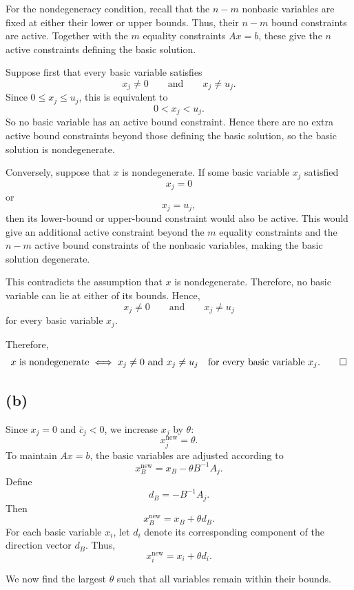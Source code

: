\documentclass{article}
\begin{document}
\vspace{5mm}


For the nondegeneracy condition, recall that the $n-m$ nonbasic
variables are fixed at either their lower or upper bounds. Thus, their
$n-m$ bound constraints are active. Together with the $m$ equality
constraints $Ax=b$, these give the $n$ active constraints defining the
basic solution.

Suppose first that every basic variable satisfies
\[
x_j \neq 0
\qquad\text{and}\qquad
x_j \neq u_j.
\]
Since $0\leq x_j\leq u_j$, this is equivalent to
\[
0<x_j<u_j.
\]
So no basic variable has an active bound constraint. Hence there are
no extra active bound constraints beyond those defining the basic
solution, so the basic solution is nondegenerate.


Conversely, suppose that $x$ is nondegenerate. If some basic variable
$x_j$ satisfied
\[
x_j=0
\]
or
\[
x_j=u_j,
\]
then its lower-bound or upper-bound constraint would also be active.
This would give an additional active constraint beyond the $m$ equality
constraints and the $n-m$ active bound constraints of the nonbasic
variables, making the basic solution degenerate.

This contradicts the assumption that $x$ is nondegenerate. Therefore,
no basic variable can lie at either of its bounds. Hence,
\[
x_j\neq 0
\qquad\text{and}\qquad
x_j\neq u_j
\]
for every basic variable $x_j$.

Therefore,
\[
x \text{ is nondegenerate}
\iff
x_j\neq 0 \text{ and } x_j\neq u_j
\quad\text{for every basic variable }x_j. \qed
\]





\vspace{5mm}
\subsection*{(b)}

Since $x_j=0$ and $\bar c_j<0$, we increase $x_j$ by $\theta$:
\[
x_j^{\mathrm{new}}=\theta.
\]
To maintain $Ax=b$, the basic variables are adjusted according to
\[
x_B^{\mathrm{new}}
=
x_B-\theta B^{-1}A_j.
\]
Define
\[
\boxed{d_B=-B^{-1}A_j.}
\]
Then
\[
x_B^{\mathrm{new}}=x_B+\theta d_B.
\]
For each basic variable $x_i$, let $d_i$ denote its corresponding
component of the direction vector $d_B$. Thus,
\[
x_i^{\mathrm{new}}=x_i+\theta d_i.
\]

We now find the largest $\theta$ such that all variables remain within
their bounds.
\end{document}
